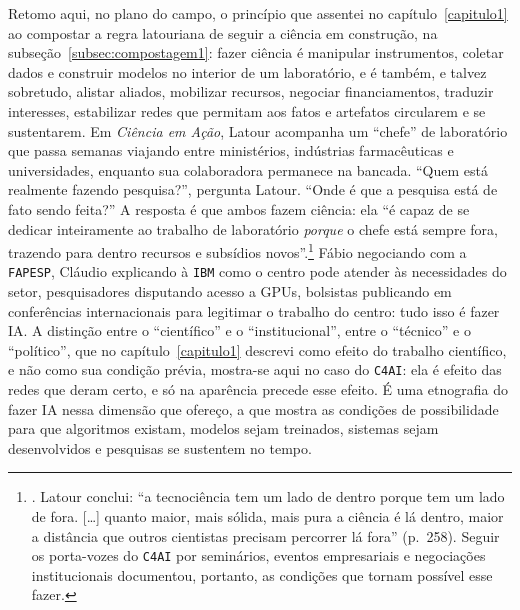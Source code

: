 Retomo aqui, no plano do campo, o princípio que assentei no capítulo~\ref{capitulo1} ao compostar a regra latouriana de seguir a ciência em construção, na subseção~\ref{subsec:compostagem1}: fazer ciência é manipular instrumentos, coletar dados e construir modelos no interior de um laboratório, e é também, e talvez sobretudo, alistar aliados, mobilizar recursos, negociar financiamentos, traduzir interesses, estabilizar redes que permitam aos fatos e artefatos circularem e se sustentarem. Em \textit{Ciência em Ação}, Latour acompanha um \enquote{chefe} de laboratório que passa semanas viajando entre ministérios, indústrias farmacêuticas e universidades, enquanto sua colaboradora permanece na bancada. \enquote{Quem está realmente fazendo pesquisa?}, pergunta Latour. \enquote{Onde é que a pesquisa está de fato sendo feita?} A resposta é que ambos fazem ciência: ela \enquote{é capaz de se dedicar inteiramente ao trabalho de laboratório \textit{porque} o chefe está sempre fora, trazendo para dentro recursos e subsídios novos}.\footnote{\textcite[p.~257]{Latour2011CienciaEmAcao}. Latour conclui: \enquote{a tecnociência tem um lado de dentro porque tem um lado de fora. [\ldots] quanto maior, mais sólida, mais pura a ciência é lá dentro, maior a distância que outros cientistas precisam percorrer lá fora} (p.~258). Seguir os porta-vozes do \texttt{C4AI} por seminários, eventos empresariais e negociações institucionais documentou, portanto, as condições que tornam possível esse fazer.} Fábio negociando com a \texttt{FAPESP}, Cláudio explicando à \texttt{IBM} como o centro pode atender às necessidades do setor, pesquisadores disputando acesso a GPUs, bolsistas publicando em conferências internacionais para legitimar o trabalho do centro: tudo isso é fazer IA. A distinção entre o \enquote{científico} e o \enquote{institucional}, entre o \enquote{técnico} e o \enquote{político}, que no capítulo~\ref{capitulo1} descrevi como efeito do trabalho científico, e não como sua condição prévia, mostra-se aqui no caso do \texttt{C4AI}: ela é efeito das redes que deram certo, e só na aparência precede esse efeito. É uma etnografia do fazer IA nessa dimensão que ofereço, a que mostra as condições de possibilidade para que algoritmos existam, modelos sejam treinados, sistemas sejam desenvolvidos e pesquisas se sustentem no tempo.


